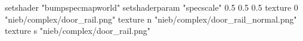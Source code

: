 setshader "bumpspecmapworld"
setshaderparam "specscale" 0.5 0.5 0.5
   texture 0 "nieb/complex/door_rail.png"
   texture n "nieb/complex/door_rail_normal.png"
   texture s "nieb/complex/door_rail.png"